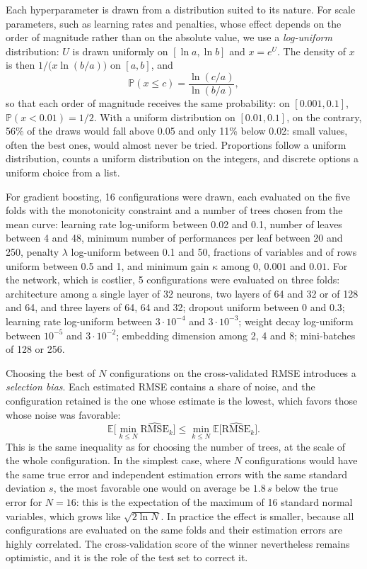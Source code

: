 \documentclass[11pt,a4paper]{article}
\newcommand{\E}{\mathbb{E}}
\begin{document}
Each hyperparameter is drawn from a distribution suited to its nature. For scale parameters, such as learning rates
and penalties, whose effect depends on the order of magnitude rather than on the absolute value, we use a
\emph{log-uniform} distribution: $U$ is drawn uniformly on $[\ln a, \ln b]$ and $x = e^U$. The density of $x$ is then
$1/\big(x \ln(b/a)\big)$ on $[a, b]$, and
\[
\mathbb{P}(x \leq c) = \frac{\ln(c/a)}{\ln(b/a)},
\]
so that each order of magnitude receives the same probability: on $[0.001, 0.1]$, $\mathbb{P}(x < 0.01) = 1/2$. With a
uniform distribution on $[0.01, 0.1]$, on the contrary, 56\% of the draws would fall above 0.05 and only 11\% below
0.02: small values, often the best ones, would almost never be tried. Proportions follow a uniform distribution,
counts a uniform distribution on the integers, and discrete options a uniform choice from a list.

For gradient boosting, 16 configurations were drawn, each evaluated on the five folds with the monotonicity constraint
and a number of trees chosen from the mean curve: learning rate log-uniform between 0.02 and 0.1, number of leaves
between 4 and 48, minimum number of performances per leaf between 20 and 250, penalty $\lambda$ log-uniform between 0.1
and 50, fractions of variables and of rows uniform between 0.5 and 1, and minimum gain $\kappa$ among 0, $0.001$ and
$0.01$. For the network, which is costlier, 5 configurations were evaluated on three folds: architecture among a single
layer of 32 neurons, two layers of 64 and 32 or of 128 and 64, and three layers of 64, 64 and 32; dropout uniform
between 0 and 0.3; learning rate log-uniform between $3\cdot10^{-4}$ and $3\cdot10^{-3}$; weight decay log-uniform
between $10^{-5}$ and $3\cdot10^{-2}$; embedding dimension among 2, 4 and 8; mini-batches of 128 or 256.

Choosing the best of $N$ configurations on the cross-validated RMSE introduces a \emph{selection bias}. Each estimated
RMSE contains a share of noise, and the configuration retained is the one whose estimate is the lowest, which favors
those whose noise was favorable:
\[
\E\Big[\min_{k \leq N} \widehat{\mathrm{RMSE}}_k\Big] \leq \min_{k \leq N} \E\big[\widehat{\mathrm{RMSE}}_k\big] .
\]
This is the same inequality as for choosing the number of trees, at the scale of the whole configuration. In the
simplest case, where $N$ configurations would have the same true error and independent estimation errors with the same
standard deviation $s$, the most favorable one would on average be $1.8\,s$ below the true error for $N = 16$: this is
the expectation of the maximum of 16 standard normal variables, which grows like $\sqrt{2\ln N}$. In practice the
effect is smaller, because all configurations are evaluated on the same folds and their estimation errors are highly
correlated. The cross-validation score of the winner nevertheless remains optimistic, and it is the role of the test
set to correct it.
\end{document}

